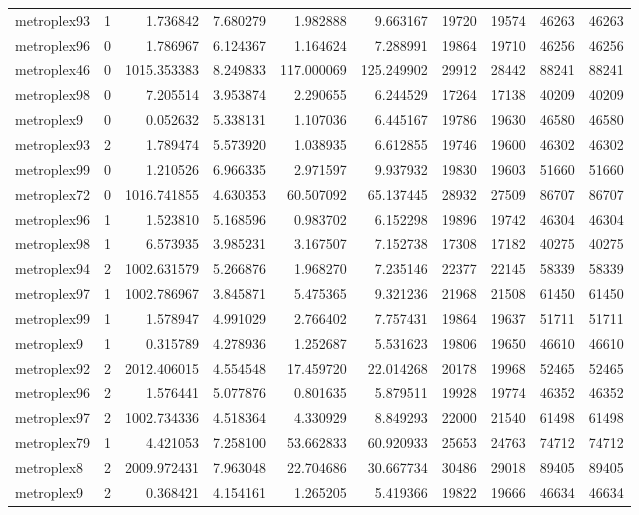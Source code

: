 \begin{longtable}{|l|r|r|r|r|r|r|r|r|r|}
metroplex93 & 1 & 1.736842 & 7.680279 & 1.982888 & 9.663167 & 19720 & 19574 & 46263 & 46263 \\
metroplex96 & 0 & 1.786967 & 6.124367 & 1.164624 & 7.288991 & 19864 & 19710 & 46256 & 46256 \\
metroplex46 & 0 & 1015.353383 & 8.249833 & 117.000069 & 125.249902 & 29912 & 28442 & 88241 & 88241 \\
metroplex98 & 0 & 7.205514 & 3.953874 & 2.290655 & 6.244529 & 17264 & 17138 & 40209 & 40209 \\
metroplex9 & 0 & 0.052632 & 5.338131 & 1.107036 & 6.445167 & 19786 & 19630 & 46580 & 46580 \\
metroplex93 & 2 & 1.789474 & 5.573920 & 1.038935 & 6.612855 & 19746 & 19600 & 46302 & 46302 \\
metroplex99 & 0 & 1.210526 & 6.966335 & 2.971597 & 9.937932 & 19830 & 19603 & 51660 & 51660 \\
metroplex72 & 0 & 1016.741855 & 4.630353 & 60.507092 & 65.137445 & 28932 & 27509 & 86707 & 86707 \\
metroplex96 & 1 & 1.523810 & 5.168596 & 0.983702 & 6.152298 & 19896 & 19742 & 46304 & 46304 \\
metroplex98 & 1 & 6.573935 & 3.985231 & 3.167507 & 7.152738 & 17308 & 17182 & 40275 & 40275 \\
metroplex94 & 2 & 1002.631579 & 5.266876 & 1.968270 & 7.235146 & 22377 & 22145 & 58339 & 58339 \\
metroplex97 & 1 & 1002.786967 & 3.845871 & 5.475365 & 9.321236 & 21968 & 21508 & 61450 & 61450 \\
metroplex99 & 1 & 1.578947 & 4.991029 & 2.766402 & 7.757431 & 19864 & 19637 & 51711 & 51711 \\
metroplex9 & 1 & 0.315789 & 4.278936 & 1.252687 & 5.531623 & 19806 & 19650 & 46610 & 46610 \\
metroplex92 & 2 & 2012.406015 & 4.554548 & 17.459720 & 22.014268 & 20178 & 19968 & 52465 & 52465 \\
metroplex96 & 2 & 1.576441 & 5.077876 & 0.801635 & 5.879511 & 19928 & 19774 & 46352 & 46352 \\
metroplex97 & 2 & 1002.734336 & 4.518364 & 4.330929 & 8.849293 & 22000 & 21540 & 61498 & 61498 \\
metroplex79 & 1 & 4.421053 & 7.258100 & 53.662833 & 60.920933 & 25653 & 24763 & 74712 & 74712 \\
metroplex8 & 2 & 2009.972431 & 7.963048 & 22.704686 & 30.667734 & 30486 & 29018 & 89405 & 89405 \\
metroplex9 & 2 & 0.368421 & 4.154161 & 1.265205 & 5.419366 & 19822 & 19666 & 46634 & 46634 \\

\end{longtable}
